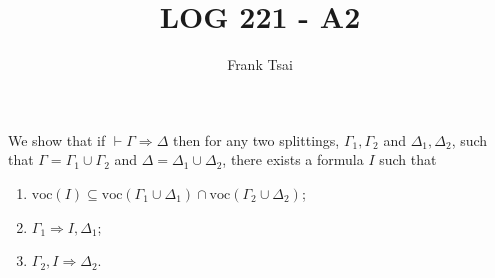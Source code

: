 \documentclass[a4paper]{article}
\title{LOG 221 - A2}
\author{Frank Tsai}
\newcommand{\voc}{\mathrm{voc}}
\begin{document}
\maketitle

We show that if $\vdash \Gamma \Rightarrow \Delta$ then for any two splittings, $\Gamma_1, \Gamma_2$ and $\Delta_1, \Delta_2$, such that $\Gamma = \Gamma_1 \cup \Gamma_2$ and $\Delta = \Delta_1 \cup \Delta_2$, there exists a formula $I$ such that
\begin{enumerate}
\item $\voc(I) \subseteq \voc(\Gamma_1 \cup \Delta_1) \cap \voc(\Gamma_2 \cup \Delta_2)$;
\item $\Gamma_1 \Rightarrow I, \Delta_1$;
\item $\Gamma_2, I \Rightarrow \Delta_2$.
\end{enumerate}
\end{document}

